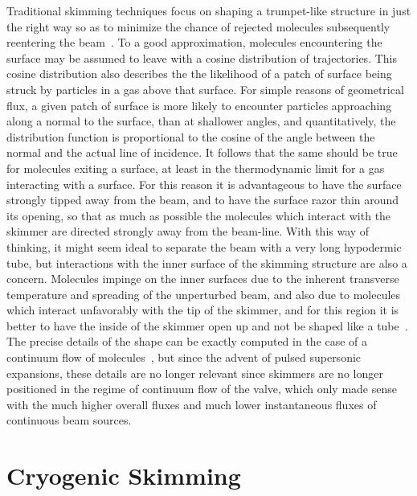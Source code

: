Traditional skimming techniques focus on shaping a trumpet-like structure in just the right way so as to minimize the chance of rejected molecules subsequently reentering the beam~\cite{Bossel1971,Bossel1974}.
To a good approximation, molecules encountering the surface may be assumed to leave with a cosine distribution of trajectories.
This cosine distribution also describes the the likelihood of a patch of surface being struck by particles in a gas above that surface.
For simple reasons of geometrical flux, a given patch of surface is more likely to encounter particles approaching along a normal to the surface, than at shallower angles, and quantitatively, the distribution function is proportional to the cosine of the angle between the normal and the actual line of incidence.
It follows that the same should be true for molecules exiting a surface, at least in the thermodynamic limit for a gas interacting with a surface.
For this reason it is advantageous to have the surface strongly tipped away from the beam, and to have the surface razor thin around its opening, so that as much as possible the molecules which interact with the skimmer are directed strongly away from the beam-line.
With this way of thinking, it might seem ideal to separate the beam with a very long hypodermic tube, but interactions with the inner surface of the skimming structure are also a concern.
Molecules impinge on the inner surfaces due to the inherent transverse temperature and spreading of the unperturbed beam, and also due to molecules which interact unfavorably with the tip of the skimmer, and for this region it is better to have the inside of the skimmer open up and not be shaped like a tube~\citep[Sec.~2.4]{Bossel1971}.
The precise details of the shape can be exactly computed in the case of a continuum flow of molecules~\cite{Campargue1984}, but since the advent of pulsed supersonic expansions, these details are no longer relevant since skimmers are no longer positioned in the regime of continuum flow of the valve, which only made sense with the much higher overall fluxes and much lower instantaneous fluxes of continuous beam sources.

\section{Cryogenic Skimming}

